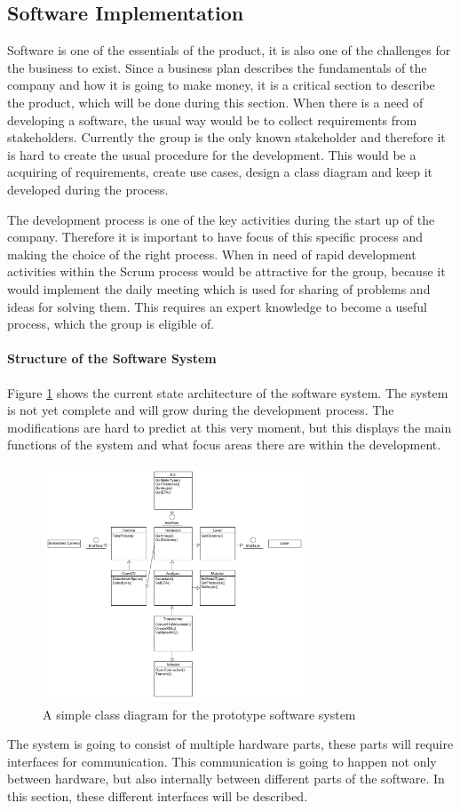 \subsection{Software Implementation}
Software is one of the essentials of the product, it is also one of the challenges for the business to exist. Since a business plan describes the fundamentals of the company and how it is going to make money, it is a critical section to describe the product, which will be done during this section. When there is a need of developing a software, the usual way would be to collect requirements from stakeholders. Currently the group is the only known stakeholder and therefore it is hard to create the usual procedure for the development. This would be a acquiring of requirements, create use cases, design a class diagram and keep it developed during the process. 

The development process is one of the key activities during the start up of the company. Therefore it is important to have focus of this specific process and making the choice of the right process. When in need of rapid development activities within the Scrum process would be attractive for the group, because it would implement the daily meeting which is used for sharing of problems and ideas for solving them. This requires an expert knowledge to become a useful process, which the group is eligible of.
\clearpage
\paragraph*{Structure of the Software System}
Figure \ref{ClassDiagram} shows the current state architecture of the software system. The system is not yet complete and will grow during the development process. The modifications are hard to predict at this very moment, but this displays the main functions of the system and what focus areas there are within the development. 
\begin{figure}[h!]
\centering
\includegraphics[width=0.7\textwidth]{graphics/ClassDiagram}
\caption{A simple class diagram for the prototype software system}
\label{ClassDiagram}
\end{figure}
The system is going to consist of multiple hardware parts, these parts will require interfaces for communication. This communication is going to happen not only between hardware, but also internally between different parts of the software.
In this section, these different interfaces will be described. 

